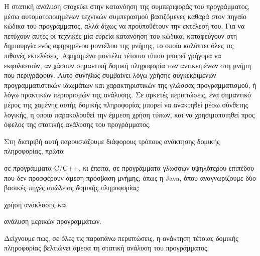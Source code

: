 

Η στατική ανάλυση στοχεύει στην κατανόηση της συμπεριφοράς του
προγράμματος, μέσω αυτοματοποιημένων τεχνικών συμπερασμού βασιζόμενες
καθαρά στον πηγαίο κώδικα του προγράμματος, αλλά δίχως να προϋποθέτουν
την εκτέλεσή του. Για να πετύχουν αυτές οι τεχνικές μία
ευρεία κατανόηση του κώδικα, καταφεύγουν στη δημιουργία ενός
αφηρημένου μοντέλου της μνήμης, το οποίο καλύπτει όλες τις πιθανές
εκτελέσεις. Αφηρημένα μοντέλα τέτοιου τύπου μπορεί γρήγορα να
εκφυλιστούν, αν χάσουν σημαντική δομική πληροφορία των αντικειμένων
στη μνήμη που περιγράφουν. Αυτό συνήθως συμβαίνει λόγω χρήσης
συγκεκριμένων προγραμματιστικών ιδιωμάτων και χαρακτηριστικών της
γλώσσας προγραμματισμού, ή λόγω πρακτικών περιορισμών της ανάλυσης.
Σε αρκετές περιπτώσεις, ένα σημαντικό μέρος της χαμένης αυτής δομικής
πληροφορίας μπορεί να ανακτηθεί μέσω σύνθετης λογικής, η οποία
παρακολουθεί την έμμεση χρήση τύπων, και να χρησιμοποιηθεί προς όφελος
της στατικής ανάλυσης του προγράμματος.

Στη διατριβή αυτή παρουσιάζουμε διάφορους τρόπους ανάκτησης δομικής
πληροφορίας, πρώτα
\begin{inparaenum}[(1)]
\item σε προγράμματα {\en C/C++}, κι έπειτα, σε προγράμματα γλωσσών
  υψηλότερου επιπέδου που δεν προσφέρουν άμεση πρόσβαση μνήμης, όπως η
  {\en Java}, όπου αναγνωρίζουμε δύο βασικές πηγές απώλειας δομικής
  πληροφορίας:
\item χρήση ανάκλασης και
\item ανάλυση μερικών προγραμμάτων.
\end{inparaenum}
Δείχνουμε πως, σε όλες τις παραπάνω περιπτώσεις, η ανάκτηση τέτοιας
δομικής πληροφορίας βελτιώνει άμεσα τη στατική ανάλυση του
προγράμματος.

